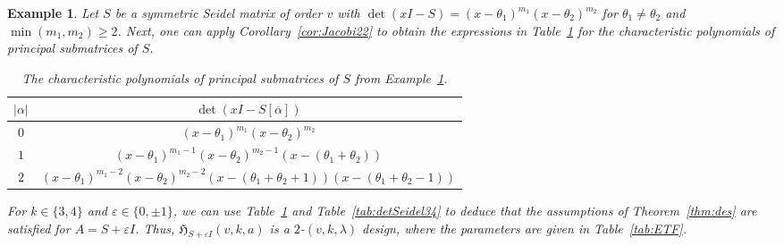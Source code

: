 \documentclass[11pt]{article}
\newtheorem{example}[theorem]{Example}
\newtheorem{corollary}[theorem]{Corollary}
\begin{document}
\begin{example}\label{ex:ETF}
Let $S$ be a symmetric Seidel matrix of order $v$ with $\det(xI-S) = (x-\theta_1)^{m_1}(x-\theta_2)^{m_2}$ for $\theta_1\neq \theta_2$ and $\min(m_1,m_2) \geqslant 2$. 
Next, one can apply Corollary~\ref{cor:Jacobi22} to obtain the expressions in Table~\ref{tab:charSeidel0} for the characteristic polynomials of principal submatrices of $S$.
\begin{table}[h!]
    \centering
    \begin{tabular}{c|c}
        $|\alpha|$ & $\det(xI-S[\overline \alpha])$  \\
        \hline
        $0$ & $(x-\theta_1)^{m_1}(x-\theta_2)^{m_2}$  \\
        $1$ & $(x-\theta_1)^{m_1-1}(x-\theta_2)^{m_2-1}(x-(\theta_1+\theta_2))$  \\
        $2$ & $(x-\theta_1)^{m_1-2}(x-\theta_2)^{m_2-2}(x-(\theta_1+\theta_2+1))(x-(\theta_1+\theta_2-1))$  \\
    \end{tabular}
    \caption{The characteristic polynomials of principal submatrices of $S$ from Example~\ref{ex:ETF}.}
    \label{tab:charSeidel0}
\end{table}

For $k\in\{3,4\}$ and $\varepsilon \in \{0,\pm 1\}$, we can use Table~\ref{tab:charSeidel0} and Table~\ref{tab:detSeidel34} to deduce that the assumptions of Theorem~\ref{thm:des} are satisfied for $A = S+\varepsilon I$.
Thus, $\mathfrak H_{S+\varepsilon I}(v,k,a)$ is a $2$-$(v,k,\lambda)$ design, where the parameters are given in Table~\ref{tab:ETF}.


\end{example}
\end{document}
